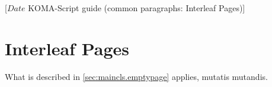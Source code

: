 %
%
%
%
%
%
%
%
% 
%
%
%
%

%
                 [$Date$
                  KOMA-Script guide (common paragraphs: Interleaf Pages)]


\makeatletter
{}%
%
%
%
\makeatother


\section{Interleaf Pages}
\label{sec:\csname label@base\endcsname.emptypage}%
\ifshortversion\IgnoreThisfalse{}\fi%
\ifIgnoreThis %
 What is described in
\autoref{sec:maincls.emptypage} applies, mutatis mutandis.
\else %
%

